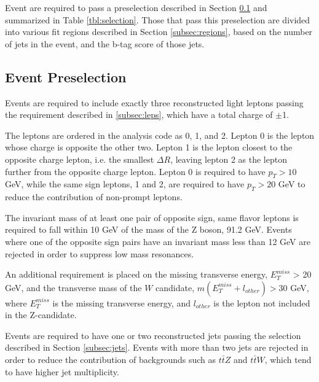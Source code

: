 
Event are required to pass a preselection described in Section \ref{subsec:presel} and summarized in Table \ref{tbl:selection}. Those that pass this preselection are divided into various fit regions described in Section \ref{subsec:regions}, based on the number of jets in the event, and the b-tag score of those jets.

\subsection{Event Preselection}
\label{subsec:presel}

Events are required to include exactly three reconstructed light leptons passing the requirement described in \ref{subsec:leps}, which have a total charge of $\pm$1. %

The leptons are ordered in the analysis code as 0, 1, and 2. Lepton 0 is the lepton whose charge is opposite the other two. Lepton 1 is the lepton closest to the opposite charge lepton, i.e. the smallest $\Delta R$, leaving lepton 2 as the lepton further from the opposite charge lepton. Lepton 0 is required to have $p_T > 10$ GeV, while the same sign leptons, 1 and 2, are required to have $p_T > 20$ GeV to reduce the contribution of non-prompt leptons.  

The invariant mass of at least one pair of opposite sign, same flavor leptons is required to fall within 10 GeV of the mass of the Z boson, 91.2 GeV. Events where one of the opposite sign pairs have an invariant mass less than 12 GeV are rejected in order to suppress low mass resonances. %

An additional requirement is placed on the missing transverse energy, $E^{miss}_T$ > 20 GeV, and the transverse mass of the $W$ candidate, $m(E^{miss}_T + l_{other}) > 30$ GeV, where $E^{miss}_T$ is the missing transverse energy, and $l_{other}$ is the lepton not included in the Z-candidate. 

Events are required to have one or two reconstructed jets passing the selection described in Section \ref{subsec:jets}. Events with more than two jets are rejected in order to reduce the contribution of backgrounds such as $t\bar{t}Z$ and $t\bar{t}W$, which tend to have higher jet multiplicity. 

